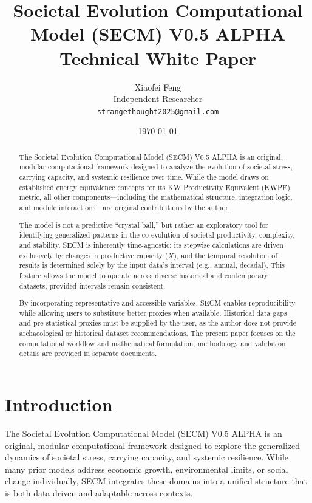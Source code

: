 \documentclass[12pt,a4paper]{article}
\title{\textbf{Societal Evolution Computational Model (SECM) V0.5 ALPHA} \\
\large Technical White Paper}
\author{Xiaofei Feng \\ Independent Researcher \\
\texttt{strangethought2025@gmail.com}}
\date{\today}
\begin{document}
\maketitle
\thispagestyle{empty}

\begin{abstract}
The Societal Evolution Computational Model (SECM) V0.5 ALPHA is an original, modular computational framework designed to analyze the evolution of societal stress, carrying capacity, and systemic resilience over time. While the model draws on established energy equivalence concepts for its KW Productivity Equivalent (KWPE) metric, all other components---including the mathematical structure, integration logic, and module interactions---are original contributions by the author.

The model is not a predictive “crystal ball,” but rather an exploratory tool for identifying generalized patterns in the co-evolution of societal productivity, complexity, and stability. SECM is inherently time-agnostic: its stepwise calculations are driven exclusively by changes in productive capacity (\(X\)), and the temporal resolution of results is determined solely by the input data’s interval (e.g., annual, decadal). This feature allows the model to operate across diverse historical and contemporary datasets, provided intervals remain consistent.

By incorporating representative and accessible variables, SECM enables reproducibility while allowing users to substitute better proxies when available. Historical data gaps and pre-statistical proxies must be supplied by the user, as the author does not provide archaeological or historical dataset recommendations. The present paper focuses on the computational workflow and mathematical formulation; methodology and validation details are provided in separate documents.

\end{abstract}

\newpage
\tableofcontents
\newpage
\section{Introduction}

The Societal Evolution Computational Model (SECM) V0.5 ALPHA is an original, modular computational framework designed to explore the generalized dynamics of societal stress, carrying capacity, and systemic resilience. While many prior models address economic growth, environmental limits, or social change individually, SECM integrates these domains into a unified structure that is both data-driven and adaptable across contexts.
\end{document}
